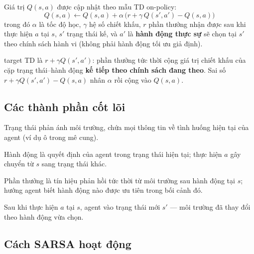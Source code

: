 \begin{dinhnghia}[title={Công thức SARSA}]
Giá trị $Q(s,a)$ được cập nhật theo mẫu TD on-policy:
\[
Q(s,a) \leftarrow Q(s,a) + \alpha\,\bigl(r + \gamma\, Q(s',a') - Q(s,a)\bigr)
\]
trong đó $\alpha$ là tốc độ học, $\gamma$ hệ số chiết khấu, $r$ phần thưởng nhận được sau khi thực hiện $a$ tại $s$, $s'$ trạng thái kế, và $a'$ là \textbf{hành động thực sự} sẽ chọn tại $s'$ theo chính sách hành vi (không phải hành động tối ưu giả định).
\end{dinhnghia}

\begin{ynghia}[title={Đọc nhanh công thức}]
target TD là $r + \gamma Q(s',a')$: phần thưởng tức thời cộng giá trị chiết khấu của cặp trạng thái--hành động \textbf{kế tiếp theo chính sách đang theo}. Sai số $r + \gamma Q(s',a') - Q(s,a)$ nhân $\alpha$ rồi cộng vào $Q(s,a)$.
\end{ynghia}

\subsection{Các thành phần cốt lõi}

\begin{dinhnghia}[title={Trạng thái $S$}]
Trạng thái phản ánh môi trường, chứa mọi thông tin về tình huống hiện tại của agent (ví dụ ô trong mê cung).
\end{dinhnghia}

\begin{dinhnghia}[title={Hành động $A$}]
Hành động là quyết định của agent trong trạng thái hiện tại; thực hiện $a$ gây chuyển từ $s$ sang trạng thái khác.
\end{dinhnghia}

\begin{dinhnghia}[title={Phần thưởng $R$}]
Phần thưởng là tín hiệu phản hồi tức thời từ môi trường sau hành động tại $s$; hướng agent biết hành động nào được ưu tiên trong bối cảnh đó.
\end{dinhnghia}

\begin{dinhnghia}[title={Trạng thái kế $S'$}]
Sau khi thực hiện $a$ tại $s$, agent vào trạng thái mới $s'$ --- môi trường đã thay đổi theo hành động vừa chọn.
\end{dinhnghia}

\subsection{Cách SARSA hoạt động}

